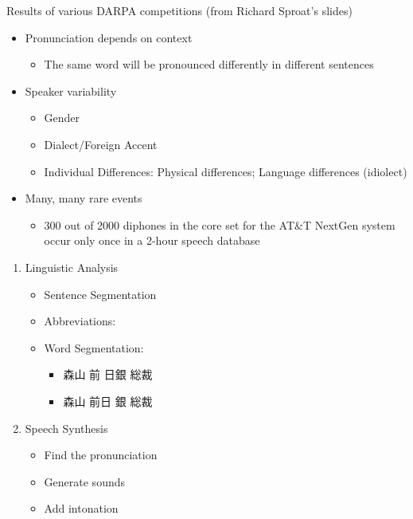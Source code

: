 \documentclass[a4paper,landscape,headrule,footrule,xetex]{foils}
\begin{document}
Results of various DARPA competitions (from Richard Sproat's slides)

\begin{itemize}
\item Pronunciation depends on context
  \begin{itemize}
  \item The same word will be pronounced differently in different sentences
  \end{itemize}
\item Speaker variability
  \begin{itemize}
  \item Gender
  \item Dialect/Foreign Accent
  \item Individual Differences: Physical differences; Language differences (idiolect)‏
  \end{itemize}
\item Many, many rare events
  \begin{itemize}
  \item 300 out of 2000 diphones in the core set for the AT\&T NextGen system occur only once in a 2-hour speech database
  \end{itemize}
\end{itemize}



\begin{enumerate}
\item Linguistic Analysis
  \begin{itemize}
  \item Sentence Segmentation
  \item Abbreviations: 
  \item Word Segmentation: 
    \begin{itemize}
    \item 森山 前 日銀 総裁 
    \item[\Bad]  森山 前日 銀 総裁　
      \end{itemize}
    \end{itemize}
\item Speech Synthesis
  \begin{itemize}
  \item Find the pronunciation
  \item Generate sounds
  \item Add intonation
  \end{itemize}
\end{enumerate}
\end{document}
